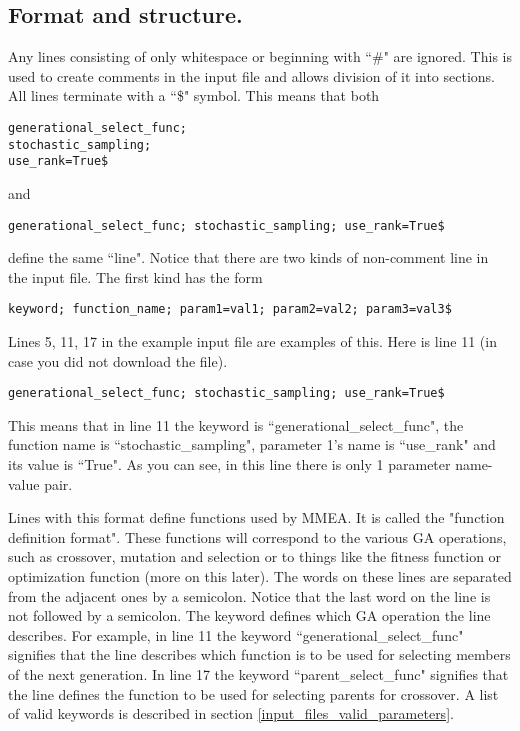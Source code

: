 \documentclass{article}
\begin{document}
\subsection{Format and structure.}
\label{input_files_format_and_structure}
Any lines consisting of only whitespace or beginning with ``\#" are ignored. This is used to create comments in the input file and allows division of it into sections. All lines terminate with a ``\$" symbol. This means that both
\begin{verbatim}
generational_select_func; 
stochastic_sampling; 
use_rank=True$
\end{verbatim}
and
\begin{verbatim}
generational_select_func; stochastic_sampling; use_rank=True$
\end{verbatim}
define the same ``line". Notice that there are two kinds of non-comment line in the input file. The first kind has the form
\begin{verbatim}
keyword; function_name; param1=val1; param2=val2; param3=val3$
\end{verbatim}
Lines 5, 11, 17 in the example input file are examples of this. Here is line 11 (in case you did not download the file).
\begin{verbatim}
generational_select_func; stochastic_sampling; use_rank=True$
\end{verbatim}
This means that in line 11 the keyword is ``generational\_select\_func", the function name is ``stochastic\_sampling", parameter 1's name is ``use\_rank" and its value is ``True". As you can see, in this line there is only 1 parameter name-value pair.

Lines with this format define functions used by MMEA. It is called the "function definition format". These functions will correspond to the various GA operations, such as crossover, mutation and selection or to things like the fitness function or optimization function (more on this later). The words on these lines are separated from the adjacent ones by a semicolon. Notice that the last word on the line is not followed by a semicolon. The keyword defines which GA operation the line describes. For example, in line 11 the keyword ``generational\_select\_func" signifies that the line describes which function is to be used for selecting members of the next generation. In line 17 the keyword ``parent\_select\_func" signifies that the line defines the function to be used for selecting parents for crossover. A list of valid keywords is described in section \ref{input_files_valid_parameters}.
\end{document}
